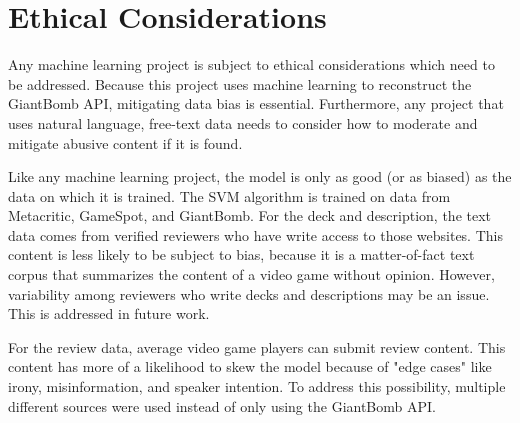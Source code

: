 \documentclass[10pt,twocolumn]{article}
\begin{document}
\section{Ethical Considerations}


Any machine learning project is subject to ethical considerations which need to be addressed. Because this project uses machine learning to reconstruct the GiantBomb API, mitigating data bias is essential. Furthermore, any project that uses natural language, free-text data needs to consider how to moderate and mitigate abusive content if it is found.

Like any machine learning project, the model is only as good (or as biased) as the data on which it is trained. The SVM algorithm is trained on data from Metacritic, GameSpot, and GiantBomb. For the deck and description, the text data comes from verified reviewers who have write access to those websites. This content is less likely to be subject to bias, because it is a matter-of-fact text corpus that summarizes the content of a video game without opinion. However, variability among reviewers who write decks and descriptions may be an issue. This is addressed in future work.

For the review data, average video game players can submit review content. This content has more of a likelihood to skew the model because of "edge cases" like irony, misinformation, and speaker intention. \cite{Vidgen} To address this possibility, multiple different sources were used instead of only using the GiantBomb API.
\end{document}
